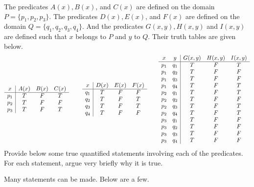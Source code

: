 \documentclass[addpoints]{exam}
\begin{document}
\begin{questions}
  \question [10] The predicates $A(x), B(x)$, and $C(x)$ are defined on the domain $P=\{p_1,p_2,p_3\}$. The predicates $D(x), E(x)$, and $F(x)$ are defined on the domain $Q=\{q_1,q_2,q_3,q_4\}$.  And the predicates $G(x,y), H(x,y)$ and  $I(x,y)$ are defined such that $x$ belongs to $P$ and $y$ to $Q$. Their truth tables are given below.
  \[
    \begin{array}{{c|ccc}}
      x & A(x) & B(x) & C(x) \\
      \hline
      p_1 & T & F & T \\
      p_2 & T & F & F \\
      p_3 & T & F & T \\
    \end{array}\
    \qquad
    \begin{array}{{c|ccc}}
      x & D(x) & E(x) & F(x) \\
      \hline
      q_1 & T & F & F \\
      q_2 & T & F & T \\
      q_3 & T & F & T \\
      q_4 & T & F & F \\
    \end{array}
    \qquad
    \begin{array}{{cc|ccc}}
      x & y & G(x,y) & H(x,y) & I(x,y)\\
      \hline
      p_1 & q_1 & T & F & T \\
      p_1 & q_2 & T & F & F \\
      p_1 & q_3 & T & F & F \\
      p_1 & q_4 & T & F & T \\
      p_2 & q_1 & T & F & T \\
      p_2 & q_2 & T & F & F \\
      p_2 & q_3 & T & F & T \\
      p_2 & q_4 & T & F & T \\
      p_3 & q_1 & T & F & F \\
      p_3 & q_2 & T & F & F \\
      p_3 & q_3 & T & F & F \\
      p_3 & q_4 & T & F & F \\
    \end{array}
  \]  
  Provide below some true quantified statements involving each of the predicates. For each statement, argue very briefly why it is true.
  
  \begin{solution}
    Many statements can be made. Below are a few.
    

\end{solution}
\end{questions}
\end{document}
